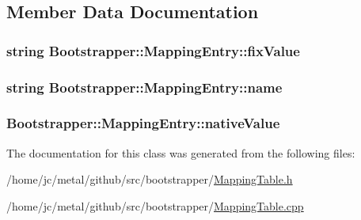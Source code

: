 \subsection{Member Data Documentation}
\hypertarget{classBootstrapper_1_1MappingEntry_ae1c751d1bc9a672d87ec1f5ee2a267b0}{}
\subsubsection[{fix\+Value}]{\setlength{\rightskip}{0pt plus 5cm}string Bootstrapper\+::\+Mapping\+Entry\+::fix\+Value}\label{classBootstrapper_1_1MappingEntry_ae1c751d1bc9a672d87ec1f5ee2a267b0}
\hypertarget{classBootstrapper_1_1MappingEntry_a65b7b8ad84053949d5213f3faedba59a}{}
\subsubsection[{name}]{\setlength{\rightskip}{0pt plus 5cm}string Bootstrapper\+::\+Mapping\+Entry\+::name}\label{classBootstrapper_1_1MappingEntry_a65b7b8ad84053949d5213f3faedba59a}
\hypertarget{classBootstrapper_1_1MappingEntry_af9a9f599c7e96481c276d0a7f1589152}{}
\subsubsection[{native\+Value}]{ Bootstrapper\+::\+Mapping\+Entry\+::native\+Value}\label{classBootstrapper_1_1MappingEntry_af9a9f599c7e96481c276d0a7f1589152}


The documentation for this class was generated from the following files\+:\begin{DoxyCompactItemize}
\item 
/home/jc/metal/github/src/bootstrapper/\hyperlink{MappingTable_8h}{Mapping\+Table.\+h}\item 
/home/jc/metal/github/src/bootstrapper/\hyperlink{MappingTable_8cpp}{Mapping\+Table.\+cpp}\end{DoxyCompactItemize}
